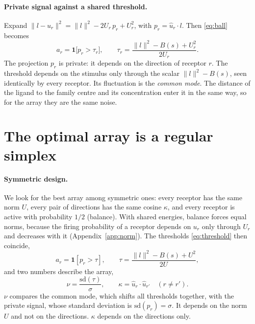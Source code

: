 \documentclass[11pt,a4paper]{article}
\newcommand{\sd}{\mathrm{sd}}
\newcommand{\uhat}{\hat{u}}
\newcommand{\one}{\mathbf{1}}
\begin{document}
\paragraph{Private signal against a shared threshold.} Expand
$\|l-u_r\|^2=\|l\|^2-2U_r\,p_r+U_r^2$, with $p_r=\uhat_r\cdot l$. Then \eqref{eq:ball}
becomes
\begin{equation}
  a_r=\one\big[p_r>\tau_r\big],
  \qquad
  \tau_r=\frac{\|l\|^2-B(s)+U_r^2}{2U_r}.
  \label{eq:threshold}
\end{equation}
The projection $p_r$ is private: it depends on the direction of receptor $r$. The
threshold depends on the stimulus only through the scalar $\|l\|^2-B(s)$, seen identically
by every receptor. Its fluctuation is the \emph{common mode}. The distance of the ligand to
the family centre and its concentration enter it in the same way, so for the array they are
the same noise.

\section{The optimal array is a regular simplex}
\label{sec:simplex}

\paragraph{Symmetric design.} We look for the best array among symmetric ones: every
receptor has the same norm $U$, every pair of directions has the same cosine $\kappa$, and
every receptor is active with probability $1/2$ (balance). With shared energies, balance
forces equal norms, because the firing probability of a receptor depends on $u_r$ only
through $U_r$ and decreases with it (Appendix~\ref{app:norm}). The thresholds
\eqref{eq:threshold} then coincide,
\begin{equation}
  a_r=\one[p_r>\tau],
  \qquad
  \tau=\frac{\|l\|^2-B(s)+U^2}{2U},
  \label{eq:tau}
\end{equation}
and two numbers describe the array,
\begin{equation}
  \nu=\frac{\sd(\tau)}{\sigma},
  \qquad
  \kappa=\uhat_r\cdot\uhat_{r'}\quad(r\neq r').
  \label{eq:nu}
\end{equation}
$\nu$ compares the common mode, which shifts all thresholds together, with the private
signal, whose standard deviation is $\sd(p_r)=\sigma$. It depends on the norm $U$ and not on
the directions. $\kappa$ depends on the directions only.
\end{document}
